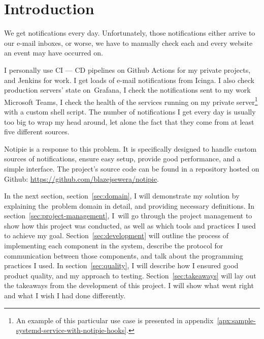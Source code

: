\section{Introduction}\label{sec:introduction}

We get notifications every day.
Unfortunately,
those notifications either arrive
to our e-mail inboxes,
or worse,
we have to manually check
each and every website an event may have occurred on.

I personally use \ac{CI} --- \ac{CD} pipelines
on Github Actions for my private projects,
and Jenkins for work.
I get loads of e-mail notifications from Icinga.
I also check production servers' state on~Grafana,
I check the notifications sent to my work Microsoft Teams,
I check the health of the services
running on my private server\footnote{
  An example of this particular use case
  is presented in appendix~\ref{apx:sample-systemd-service-with-notipie-hooks}.
} with a custom shell script.
The number of notifications I get every day
is usually too big to wrap my head around,
let alone the fact
that they come from at least five different sources.

Notipie is a response to this problem.
It is specifically designed
to handle custom sources of notifications,
ensure easy setup,
provide good performance,
and a simple interface.
The project's source code can be found
in a repository hosted
on Github: \url{https://github.com/blazejsewera/notipie}.

In the next section,
section~\ref{sec:domain},
I will demonstrate my solution
by explaining the~problem domain in detail,
and providing necessary definitions.
In section~\ref{sec:project-management},
I~will go through
the project management
to show how this project was conducted,
as well as which tools and practices
I used to achieve my goal.
Section~\ref{sec:development}
will outline the process of implementing
each component in the system,
describe the protocol for communication
between those components,
and talk about the programming practices I used.
In section~\ref{sec:quality},
I will describe how I ensured
good product quality,
and my approach to testing.
Section~\ref{sec:takeaways}
will lay out the takeaways from the development
of this project.
I will show what went right
and what I wish I had done differently.


